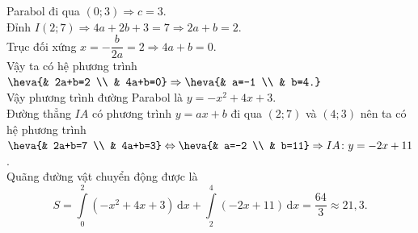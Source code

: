 \begin{bt}
{Parabol đi qua $(0;3)\Rightarrow c=3$.\\
Đỉnh $I(2;7)\Rightarrow 4a+2b+3=7\Rightarrow 2a+b=2$.\\
Trục đối xứng $x=-\dfrac{b}{2a}=2\Rightarrow 4a+b=0$.\\
Vậy ta có hệ phương trình $\heva{& 2a+b=2 \\ & 4a+b=0}\Rightarrow\heva{& a=-1 \\ & b=4.}$\\
Vậy phương trình đường Parabol là $y=-x^2+4x+3$.\\
Đường thẳng $IA$ có phương trình $y=ax+b$ đi qua $(2;7)$ và $(4;3)$ nên ta có hệ phương trình $\heva{& 2a+b=7 \\ & 4a+b=3}\Leftrightarrow\heva{& a=-2 \\ & b=11}\Rightarrow IA\colon y=-2x+11$.\\
Quãng đường vật chuyển động được là \[S=\displaystyle\int\limits_{0}^{2} \left(-x^2+4x+3\right) \mathrm{\,d}x +\displaystyle\int\limits_{2}^{4} \left(-2x+11\right) \mathrm{\,d}x=\dfrac{64}{3}\approx 21{,}3.\]
}
\end{bt}

